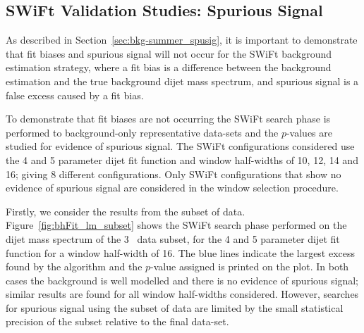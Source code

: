 

\subsection{SWiFt Validation Studies: Spurious Signal}
\label{sec:bkg-full_spuriousSignal}

As described in Section~\ref{sec:bkg-summer_spusig}, it is important to demonstrate that
fit biases and spurious signal will not occur for the SWiFt background estimation strategy,
where a fit bias is a difference between the background estimation
and the true background dijet mass spectrum, and
spurious signal is a false excess caused by a fit bias.

To demonstrate that fit biases are not occurring the SWiFt search phase is performed to background-only representative data-sets
and the \bh{} $p$-values are studied for evidence of spurious signal.
The SWiFt configurations considered use the 4 and 5 parameter dijet fit function
and window half-widths of 10, 12, 14 and 16; giving 8 different configurations.
Only SWiFt configurations that show no evidence of spurious signal are considered in the window selection procedure.

Firstly, we consider the results from the subset of data.
Figure~\ref{fig:bhFit_lm_subset} shows the SWiFt search phase performed on the dijet mass spectrum of the 3~\ifb{} data subset,
for the 4 and 5 parameter dijet fit function for a window half-width of 16.
The blue lines indicate the largest excess found by the \bh{} algorithm and the \mbox{$p$-value} assigned is printed on the plot. 
In both cases the background is well modelled and there is no evidence of spurious signal;
similar results are found for all window half-widths considered.
However, searches for spurious signal using the subset of data are limited by the 
small statistical precision of the subset relative to the final data-set.

